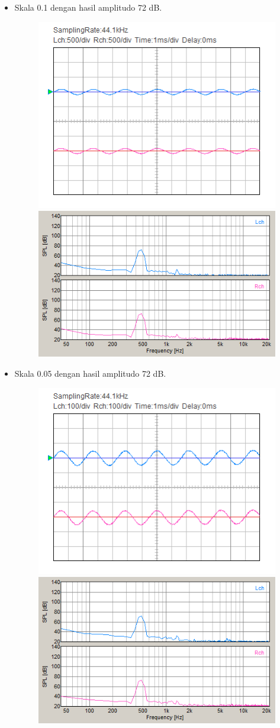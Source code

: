 \documentclass[12pt,]{article}
\begin{document}
\begin{itemize}
		\newpage
		\item Skala 0.1 dengan hasil amplitudo 72 dB.
		\begin{figure}[H]
			\centering
			\includegraphics[width=0.45\linewidth]{result/day_4/500Hz/tone01}
			\includegraphics[width=0.45\linewidth]{result/day_4/500Hz/fft_tone01}
		\end{figure}

		\item Skala 0.05 dengan hasil amplitudo 72 dB.
		\begin{figure}[H]
			\centering
			\includegraphics[width=0.45\linewidth]{result/day_4/500Hz/tone005}
			\includegraphics[width=0.45\linewidth]{result/day_4/500Hz/fft_tone005}
		\end{figure}


\end{itemize}
\end{document}
